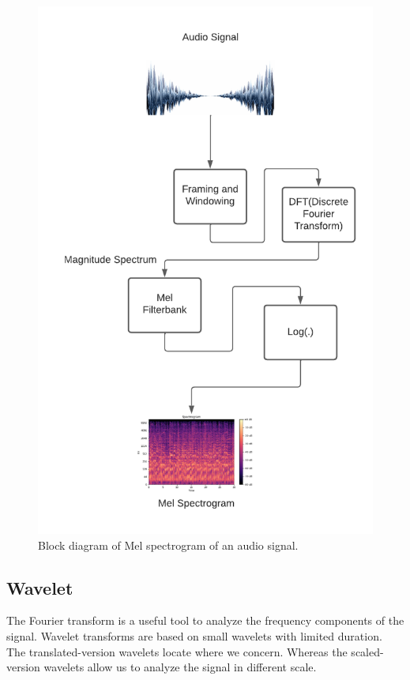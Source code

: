             \begin{figure}[ht]
            \centering
            \includegraphics[scale=0.5]{images/figure1.png}
            \caption{Block diagram of Mel spectrogram of an audio signal.}
            \label{fig: Mel Spectrogram}
            \end{figure}
    \subsection{Wavelet}
    The Fourier transform is a useful tool to analyze the frequency components of the signal.  Wavelet transforms are based on small wavelets with limited duration. The translated-version wavelets locate where we concern. Whereas the scaled-version wavelets allow us to analyze the signal in diﬀerent scale.
